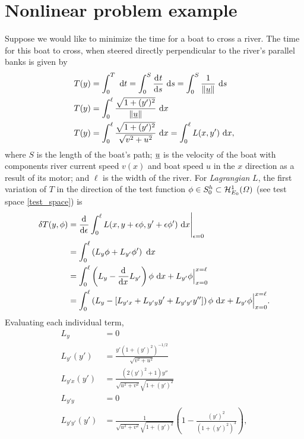 \section{Nonlinear problem example}

Suppose we would like to minimize the time for a boat to cross a river.  The time for this boat to cross, when steered directly perpendicular to the river's parallel banks is given by
\begin{align*}
  T(y) &= \int_0^T \ \mathrm{d}t = \int_0^S \frac{\mathrm{d}{^{}} t}{\mathrm{d} s{^{}} } \ \mathrm{d}s = \int_0^S \frac{1}{\Vert \underline{u}\Vert} \ \mathrm{d}s \\
  T(y) &= \int_0^{\ell} \frac{\sqrt{1 + (y')^2}}{\Vert \underline{u} \Vert} \ \mathrm{d}x \\
  T(y) &= \int_0^{\ell} \frac{\sqrt{1 + (y')^2}}{\sqrt{v^2 + u^2}} \ \mathrm{d}x = \int_0^{\ell} L(x,y') \ \mathrm{d}x,
\end{align*}
where $S$ is the length of the boat's path; $\underline{u}$ is the velocity of the boat with components river current speed $v(x)$ and boat speed $u$ in the $x$ direction as a result of its motor; and $\ell$ is the width of the river.  For \emph{Lagrangian} $L$, the first variation of $T$ in the direction of the test function $\phi \in S_0^h \subset \mathcal{H}_{E_0}^1(\varOmega)$ (see test space \cref{test_space}) is
{\footnotesize
\begin{align*}
  \delta T(y,\phi) &= \frac{\mathrm{d}{^{}} }{\mathrm{d} \epsilon{^{}} } \int_0^{\ell} L(x, y + \epsilon \phi, y' + \epsilon \phi') \ \mathrm{d}x \Bigg|_{\epsilon = 0} \\
                   &= \int_0^{\ell} \left( L_y \phi + L_{y'} \phi' \right) \ \mathrm{d}x \\
                   &= \int_0^{\ell} \left( L_y - \frac{\mathrm{d}{^{}} }{\mathrm{d} x{^{}} } L_{y'} \right) \phi \ \mathrm{d}x + L_{y'} \phi \Big|_{x=0}^{x=\ell} \\
                   &= \int_0^{\ell} \left( L_y - \left[ L_{y'x} + L_{y'y} y' + L_{y'y'} y'' \right] \right) \phi \ \mathrm{d}x + L_{y'} \phi \Big|_{x=0}^{x=\ell}.
\end{align*}}
Evaluating each individual term,
\begin{align*}
  L_y          &= 0 \\
  L_{y'}(y')   &= \frac{y' \left(1 + (y')^2\right)^{-1/2}}{\sqrt{v^2 + u^2}} \\
  L_{y'x}(y')  &= \frac{\left(2(y')^2 + 1\right) y''}{\sqrt{u^2 + v^2} \sqrt{1 + (y')^2}} \\
  L_{y'y}      &= 0 \\
  L_{y'y'}(y') &= \frac{1}{\sqrt{u^2 + v^2} \sqrt{1 + (y')^2}} \left( 1 - \frac{(y')^2}{\left(1 + (y')^2\right)^3} \right),
\end{align*}
